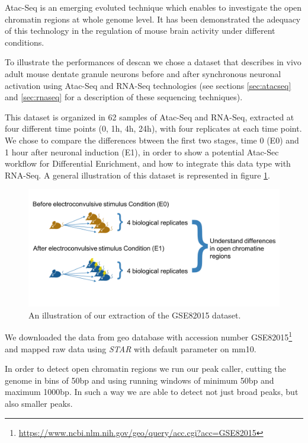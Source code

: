 Atac-Seq is an emerging evoluted technique which enables to investigate the open chromatin regions at whole genome level.
It has been demonstrated the adequacy of this technology in the regulation of mouse brain activity under different conditions.


To illustrate the performances of \gls{descan} we chose a dataset \cite{Su2017} that describes in vivo adult mouse dentate granule neurons before and after synchronous neuronal activation using Atac-Seq and RNA-Seq technologies (see sections \ref{sec:atacseq} and \ref{sec:rnaseq} for a description of these sequencing techniques).

This dataset is organized in 62 samples of Atac-Seq and RNA-Seq, extracted at four different time points (0, 1h, 4h, 24h), with four replicates at each time point.
We chose to compare the differences btween the first two stages, time 0 (E0) and 1 hour after neuronal induction (E1), in order to show a potential Atac-Sec workflow for Differential Enrichment, and how to integrate this data type with RNA-Seq. A general illustration of this dataset is represented in figure \ref{fig:atacdataset}.

\begin{figure}[H]
\includegraphics[width=\textwidth,height=\textheight,keepaspectratio]{img/descan2/dataset.png}
\caption[DEScan2 dataset illustration]{An illustration of our extraction of the GSE82015\cite{Su2017} dataset.}
\label{fig:atacdataset}
\centering
\end{figure}

We downloaded the data from \gls{geo} database \cite{Edgar2002, Barrett2013} with accession number GSE82015\footnote{\url{https://www.ncbi.nlm.nih.gov/geo/query/acc.cgi?acc=GSE82015}} and mapped raw data using \textit{STAR} \cite{Dobin2013} with default parameter on \gls{mm10}.

In order to detect open chromatin regions we run our peak caller, cutting the genome in bins of 50bp and using running windows of minimum 50bp and maximum 1000bp. In such a way we are able to detect not just broad peaks, but also smaller peaks.

